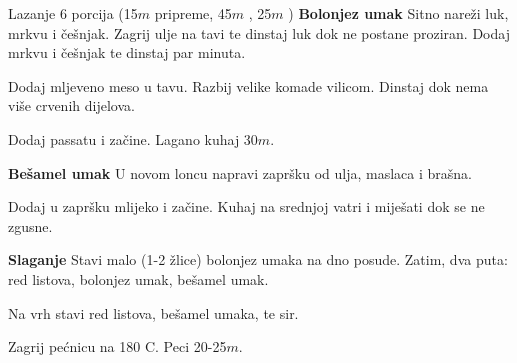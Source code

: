 \documentclass[a4paper]{article}
\begin{document}
\begin{recipe}{Lazanje}%
  {6 porcija}%
  { (15$m$ pripreme, 45$m$ \fryingpan, 25$m$ \oven )}
\ingredient[]{}{\fryingpan}
  {\bf Bolonjez umak}\newline
  Sitno nareži luk, mrkvu i češnjak. Zagrij ulje na tavi te dinstaj luk dok ne
  postane proziran. Dodaj mrkvu i češnjak te dinstaj par minuta.

  Dodaj mljeveno meso u tavu. Razbij velike komade vilicom. Dinstaj dok nema
  više crvenih dijelova.

  Dodaj passatu i začine. Lagano kuhaj 30$m$.

\ingredient[]{}{\pot}
  {\bf Bešamel umak}\newline
  U novom loncu napravi zapršku od ulja, maslaca i brašna.

  Dodaj u zapršku mlijeko i začine. Kuhaj na srednjoj vatri i miješati dok se
  ne zgusne.

\ingredient[]{}{\pan}
  {\bf Slaganje}\newline
  Stavi malo (1-2 žlice) bolonjez umaka na dno posude. Zatim, dva puta: red
  listova, bolonjez umak, bešamel umak.

  Na vrh stavi red listova, bešamel umaka, te sir.

\ingredient[]{}{\oven}
  Zagrij pećnicu na 180\0 C. Peci 20-25$m$.

\end{recipe}
\end{document}
